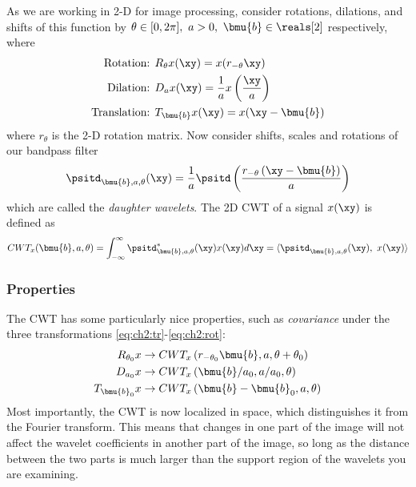 As we are working in 2-D for image processing, consider rotations, dilations, and
shifts of this function by $\theta\in [0,2\pi],\ a>0,\ \bmu{b} \in \reals[2]$ respectively, where
\begin{align}
  \text{Rotation: } & R_{\theta}x(\xy) = x(r_{-\theta}\xy) \label{eq:ch2:rot}\\
  \text{Dilation: } & D_{a}x(\xy) = \frac{1}{a} x\left(\frac{\xy}{a}\right) \label{eq:ch2:di}\\
  \text{Translation: } & T_{\bmu{b}}x(\xy) = x(\xy - \bmu{b}) \label{eq:ch2:tr}
\end{align}
where $r_\theta$ is the 2-D rotation matrix. Now consider shifts, scales and
rotations of our bandpass filter
\begin{equation}
  \psitd_{\bmu{b},a, \theta}(\xy) = \frac{1}{a}\psitd \left(\frac{r_{-\theta}\left(\xy -
  \bmu{b}\right)}{a} \right) \label{eq:ch2:2d_shifts}
\end{equation}
which are called the \emph{daughter wavelets}. The 2D CWT of a signal $x(\xy)$ is defined as
\begin{equation}
  CWT_x(\bmu{b}, a, \theta) = \int_{-\infty}^{\infty} \psitd^*_{\bmu{b}, a,
  \theta}(\xy) x(\xy) d\xy = \langle \psitd_{\bmu{b}, a, \theta}(\xy),\ x(\xy)
  \rangle \label{eq:ch2:cwt}
\end{equation}

\subsubsection{Properties}
The CWT has some particularly nice properties, such as \emph{covariance}
under the three transformations \eqref{eq:ch2:tr}-\eqref{eq:ch2:rot}:
\begin{align}
  R_{\theta_0}x & \rightarrow CWT_x\left(r_{-\theta_0}\bmu{b}, a, \theta + \theta_0 \right)  \\
  D_{a_0}x & \rightarrow CWT_x\left(\bmu{b}/a_0, a/a_0, \theta \right) \\
  T_{\bmu{b}_0}x & \rightarrow CWT_x\left(\bmu{b}-\bmu{b}_0, a, \theta \right)
\end{align}
Most importantly, the CWT is now localized in space, which distinguishes it from the
Fourier transform. This means that changes in one part of the image will not
affect the wavelet coefficients in another part of the image, so long as the
distance between the two parts is much larger than the support region of the
wavelets you are examining.

